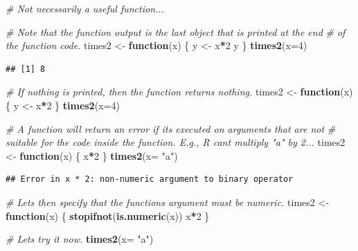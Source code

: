 \documentclass[
]{book}
\newenvironment{Shaded}{\begin{snugshade}}{\end{snugshade}}
\newcommand{\AttributeTok}[1]{\textcolor[rgb]{0.13,0.29,0.53}{#1}}
\newcommand{\CommentTok}[1]{\textcolor[rgb]{0.56,0.35,0.01}{\textit{#1}}}
\newcommand{\ControlFlowTok}[1]{\textcolor[rgb]{0.13,0.29,0.53}{\textbf{#1}}}
\newcommand{\DecValTok}[1]{\textcolor[rgb]{0.00,0.00,0.81}{#1}}
\newcommand{\FunctionTok}[1]{\textcolor[rgb]{0.13,0.29,0.53}{\textbf{#1}}}
\newcommand{\NormalTok}[1]{#1}
\newcommand{\OtherTok}[1]{\textcolor[rgb]{0.56,0.35,0.01}{#1}}
\newcommand{\SpecialCharTok}[1]{\textcolor[rgb]{0.81,0.36,0.00}{\textbf{#1}}}
\newcommand{\StringTok}[1]{\textcolor[rgb]{0.31,0.60,0.02}{#1}}
\begin{document}
\begin{Shaded}
\begin{Highlighting}[]
\CommentTok{\# Not necessarily a useful function...}

\CommentTok{\# Note that the function output is the last object that is printed at the end}
\CommentTok{\# of the function code.}
\NormalTok{times2 }\OtherTok{\textless{}{-}} \ControlFlowTok{function}\NormalTok{(x) \{}
\NormalTok{  y }\OtherTok{\textless{}{-}}\NormalTok{ x}\SpecialCharTok{*}\DecValTok{2}
\NormalTok{  y}
\NormalTok{\}}
\FunctionTok{times2}\NormalTok{(}\AttributeTok{x=}\DecValTok{4}\NormalTok{)}
\end{Highlighting}
\end{Shaded}

\begin{verbatim}
## [1] 8
\end{verbatim}

\begin{Shaded}
\begin{Highlighting}[]
\CommentTok{\# If nothing is printed, then the function returns nothing.}
\NormalTok{times2 }\OtherTok{\textless{}{-}} \ControlFlowTok{function}\NormalTok{(x) \{}
\NormalTok{  y }\OtherTok{\textless{}{-}}\NormalTok{ x}\SpecialCharTok{*}\DecValTok{2}
\NormalTok{\}}
\FunctionTok{times2}\NormalTok{(}\AttributeTok{x=}\DecValTok{4}\NormalTok{)}

\CommentTok{\# A function will return an error if it\textquotesingle{}s executed on arguments that are not}
\CommentTok{\# suitable for the code inside the function. E.g., R can\textquotesingle{}t multiply "a" by 2...}
\NormalTok{times2 }\OtherTok{\textless{}{-}} \ControlFlowTok{function}\NormalTok{(x) \{}
\NormalTok{  x}\SpecialCharTok{*}\DecValTok{2}
\NormalTok{\}}
\FunctionTok{times2}\NormalTok{(}\AttributeTok{x=} \StringTok{"a"}\NormalTok{)}
\end{Highlighting}
\end{Shaded}

\begin{verbatim}
## Error in x * 2: non-numeric argument to binary operator
\end{verbatim}

\begin{Shaded}
\begin{Highlighting}[]
\CommentTok{\# Let\textquotesingle{}s then specify that the function\textquotesingle{}s argument must be numeric.}
\NormalTok{times2 }\OtherTok{\textless{}{-}} \ControlFlowTok{function}\NormalTok{(x) \{}
  \FunctionTok{stopifnot}\NormalTok{(}\FunctionTok{is.numeric}\NormalTok{(x))  }
\NormalTok{  x}\SpecialCharTok{*}\DecValTok{2}
\NormalTok{\}}

\CommentTok{\# Let\textquotesingle{}s try it now.}
\FunctionTok{times2}\NormalTok{(}\AttributeTok{x=} \StringTok{"a"}\NormalTok{)}
\end{Highlighting}
\end{Shaded}
\end{document}
